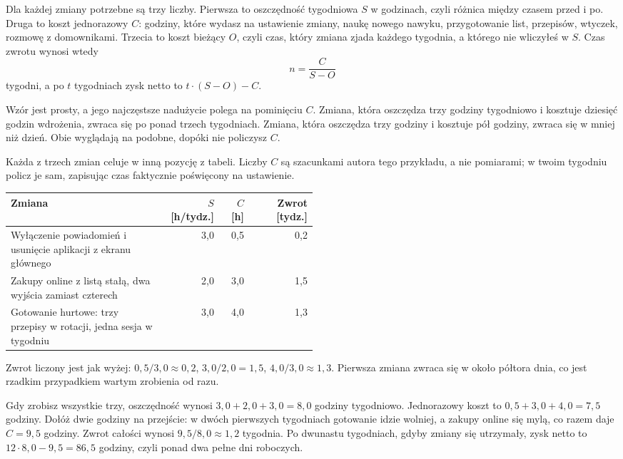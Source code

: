 Dla każdej zmiany potrzebne są trzy liczby. Pierwsza to oszczędność tygodniowa $S$ w godzinach, czyli różnica między czasem przed i po. Druga to koszt jednorazowy $C$: godziny, które wydasz na ustawienie zmiany, naukę nowego nawyku, przygotowanie list, przepisów, wtyczek, rozmowę z domownikami. Trzecia to koszt bieżący $O$, czyli czas, który zmiana zjada każdego tygodnia, a którego nie wliczyłeś w $S$. Czas zwrotu wynosi wtedy
\[
  n = \frac{C}{S - O}
\]
tygodni, a po $t$ tygodniach zysk netto to $t \cdot (S - O) - C$.

Wzór jest prosty, a jego najczęstsze nadużycie polega na pominięciu $C$. Zmiana, która oszczędza trzy godziny tygodniowo i kosztuje dziesięć godzin wdrożenia, zwraca się po ponad trzech tygodniach. Zmiana, która oszczędza trzy godziny i kosztuje pół godziny, zwraca się w mniej niż dzień. Obie wyglądają na podobne, dopóki nie policzysz $C$.

\begin{przyklad}
Każda z trzech zmian celuje w inną pozycję z tabeli. Liczby $C$ są szacunkami autora tego przykładu, a nie pomiarami; w twoim tygodniu policz je sam, zapisując czas faktycznie poświęcony na ustawienie.

\begin{center}\small
\begin{tabular}{@{}p{0.5\linewidth}rrr@{}}
\toprule
\textbf{Zmiana} & \textbf{$S$ [h/tydz.]} & \textbf{$C$ [h]} & \textbf{Zwrot [tydz.]}\\
\midrule
Wyłączenie powiadomień i usunięcie aplikacji z ekranu głównego & 3,0 & 0,5 & 0,2\\
Zakupy online z listą stałą, dwa wyjścia zamiast czterech & 2,0 & 3,0 & 1,5\\
Gotowanie hurtowe: trzy przepisy w rotacji, jedna sesja w tygodniu & 3,0 & 4,0 & 1,3\\
\bottomrule
\end{tabular}
\end{center}

Zwrot liczony jest jak wyżej: $0{,}5/3{,}0 \approx 0{,}2$, $3{,}0/2{,}0 = 1{,}5$, $4{,}0/3{,}0 \approx 1{,}3$. Pierwsza zmiana zwraca się w około półtora dnia, co jest rzadkim przypadkiem wartym zrobienia od razu.

Gdy zrobisz wszystkie trzy, oszczędność wynosi $3{,}0 + 2{,}0 + 3{,}0 = 8{,}0$ godziny tygodniowo. Jednorazowy koszt to $0{,}5 + 3{,}0 + 4{,}0 = 7{,}5$ godziny. Dołóż dwie godziny na przejście: w dwóch pierwszych tygodniach gotowanie idzie wolniej, a zakupy online się mylą, co razem daje $C = 9{,}5$ godziny. Zwrot całości wynosi $9{,}5 / 8{,}0 \approx 1{,}2$ tygodnia. Po dwunastu tygodniach, gdyby zmiany się utrzymały, zysk netto to $12 \cdot 8{,}0 - 9{,}5 = 86{,}5$ godziny, czyli ponad dwa pełne dni roboczych.
\end{przyklad}

